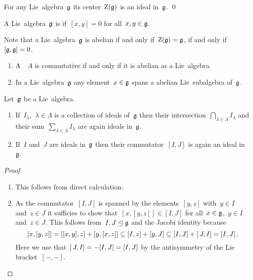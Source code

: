 \begin{lemma}
  For any Lie~algebra~$\mathfrak{g}$ its center~$\operatorname{Z}(\mathfrak{g})$ is an ideal in~$\mathfrak{g}$.
  \qed
\end{lemma}


\begin{definition}
  A Lie~algebra~$\mathfrak{g}$ is  if~$[x,y] = 0$ for all~$x, y \in \mathfrak{g}$.
\end{definition}


\begin{remark}
  Note that a Lie~algebra~$\mathfrak{g}$ is abelian if and only if~$\operatorname{Z}(\mathfrak{g}) = \mathfrak{g}$, if and only if~$[\mathfrak{g}, \mathfrak{g}] = 0$.
\end{remark}


\begin{example}
  \leavevmode
  \begin{enumerate}
    \item
      A~{\algebra{$\kf$}}~$A$ is commutative if and only if it is abelian as a Lie~algebra.
    \item
      In a Lie~algebra~$\mathfrak{g}$ any element~$x \in \mathfrak{g}$ spans a {\onedimensional} abelian Lie~subalgebra of~$\mathfrak{g}$.
  \end{enumerate}
\end{example}


\begin{lemma}
  Let~$\mathfrak{g}$ be a Lie~algebra.
  \begin{enumerate}
    \item
    If~$I_\lambda$,~$\lambda \in \Lambda$ is a collection of ideals of~$\mathfrak{g}$ then their intersection~$\bigcap_{\lambda \in \Lambda} I_\lambda$ and their sum~$\sum_{\lambda \in \Lambda} I_\lambda$ are again ideals in~$\mathfrak{g}$.
    \item
    If~$I$ and~$J$ are ideals in~$\mathfrak{g}$ then their commutator~$[I,J]$ is again an ideal in~$\mathfrak{g}$.
  \end{enumerate}
\end{lemma}


\begin{proof}
  \leavevmode
  \begin{enumerate}
    \item
      This follows from direct calculation.
    \item
      As the commutator~$[I,J]$ is spanned by the elements~$[y,z]$ with~$y \in I$ and~$z \in J$ it sufficies to show that~$[x,[y,z]] \in [I,J]$ for all~$x \in \mathfrak{g}$,~$y \in I$ and~$z \in J$.
      This follows from~$I, J \trianglelefteq \mathfrak{g}$ and the Jacobi identity because
      \[
        [x,[y,z]]
        =
        [[x,y], z] + [y, [x,z]]
        \subseteq
        [I, z] + [y, J]
        \subseteq
        [I, J] + [\, J, I]
        =
        [I,J] \,.
      \]
      Here we use that~$[\, J,I] = -[I,J] = [I,J]$ by the antisymmetry of the Lie bracket~$[-,-]$.
   \qedhere
 \end{enumerate}
\end{proof}



